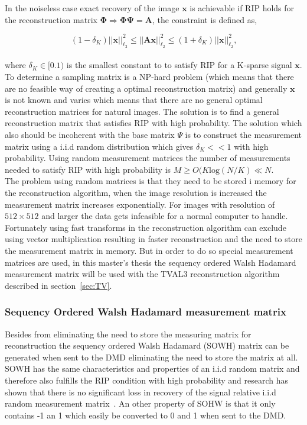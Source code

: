 In the noiseless case exact recovery of the image $\mathbf{x}$ is achievable if RIP holds for the reconstruction matrix $\mathbf{\Phi} \Rightarrow \mathbf{\Phi\Psi = A}$, the constraint is defined as,

\begin{equation}
    (1-\delta_K)||\mathbf{x}||_{\ell_2}^2\leq||\mathbf{Ax}||_{\ell_2}^2\leq(1+\delta_K)||\mathbf{x}||_{\ell_2}^2 \text{,}
\end{equation}\\[0.1in]

where $\delta_K \in [0.1)$ is the smallest constant to to satisfy RIP for a K-sparse signal $\mathbf{x}$. To determine a sampling matrix is a NP-hard problem (which means that there are no feasible way of creating a optimal reconstruction matrix) and generally $\textbf{x}$ is not known and varies which means that there are no general optimal reconstruction matrices for natural images. The solution is to find a general reconstruction matrix that satisfies RIP with high probability. The solution which also should be incoherent with the base matrix $\Psi$ is to construct the measurement matrix using a i.i.d random distribution which gives $\delta_K << 1$ with high probability. Using random measurement matrices the number of measurements needed to satisfy RIP with high probability is $M \geq O(K\text{log}(N/K) \ll N$. \cite{book:srr,article:CS_donoho1}\\[0.1in]

The problem using random matrices is that they need to be stored i memory for the reconstruction algorithm, when the image resolution is increased the measurement matrix increases exponentially. For images with resolution of $512\times 512$ and larger the data gets infeasible for a normal computer to handle.  Fortunately using fast transforms in the reconstruction algorithm can exclude using vector multiplication resulting in faster reconstruction and the need to store the measurement matrix in memory. But in order to do so special measurement matrices are used, in this master's thesis the sequency ordered Walsh Hadamard measurement matrix will be used with the TVAL3 reconstruction algorithm described in section~\ref{sec:TV}.   


\subsubsection{Sequency Ordered Walsh Hadamard measurement matrix}
\label{sec:SOWHMM}
Besides from eliminating the need to store the measuring matrix for reconstruction the sequency ordered Walsh Hadamard (SOWH) matrix can be generated when sent to the DMD eliminating the need to store the matrix at all. SOWH has the same characteristics and properties of an i.i.d random matrix and therefore also fulfills the RIP condition with high probability and research has shown that there is no significant loss in recovery of the signal relative i.i.d random measurement matrix~\cite{article:an_improved_WH_matrix}.  An other property of SOHW is that it only contains -1 an 1 which easily be converted to 0 and 1 when sent to the DMD. \\[0.1in]


